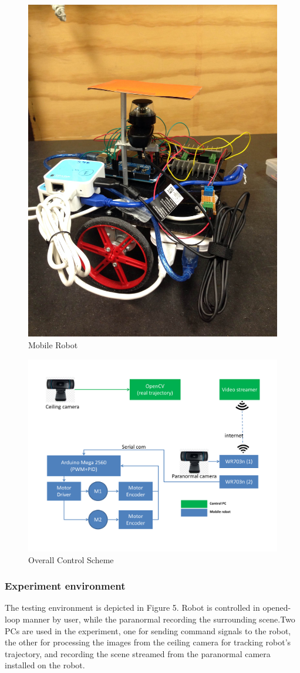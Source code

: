 \documentclass[times]{asjcauth}
\begin{document}
\begin{figure}
\centering
\includegraphics[width=.7\columnwidth]{mobileRobot.jpg}
\caption{Mobile Robot}
\end{figure}

\begin{figure}
\centering
\includegraphics[width=.7\columnwidth]{ControlFlow.pdf}
\caption{Overall Control Scheme}
\end{figure}

\subsubsection{Experiment environment}
The testing environment is depicted in Figure 5. Robot is controlled in opened-loop manner by user, while the paranormal recording the surrounding scene.Two PCs are used in the experiment, one for sending command signals to the robot, the other for processing the images from the ceiling camera for tracking robot's trajectory, and recording the scene streamed from the paranormal camera installed on the robot. 
\end{document}
